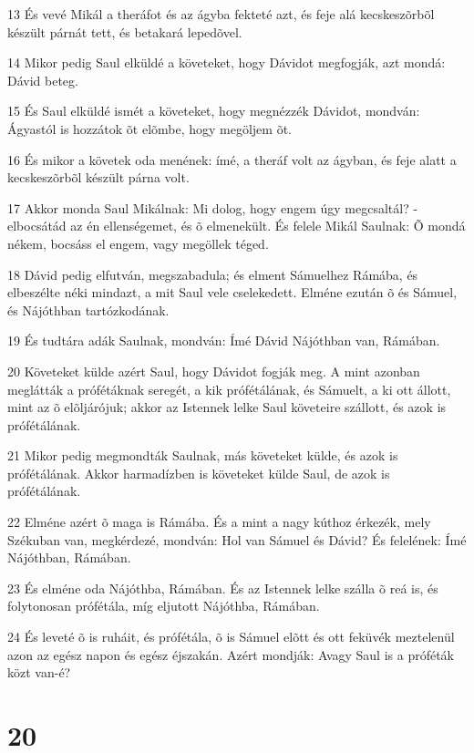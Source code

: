 \par 13 És vevé Mikál a theráfot és az ágyba fekteté azt, és feje alá kecskeszõrbõl készült párnát tett, és betakará lepedõvel.
\par 14 Mikor pedig Saul elküldé a követeket, hogy Dávidot megfogják, azt mondá: Dávid beteg.
\par 15 És Saul elküldé ismét a követeket, hogy megnézzék Dávidot, mondván: Ágyastól is hozzátok õt elõmbe, hogy megöljem õt.
\par 16 És mikor a követek oda menének: ímé, a theráf volt az ágyban, és feje alatt a kecskeszõrbõl készült párna volt.
\par 17 Akkor monda Saul Mikálnak: Mi dolog, hogy engem úgy megcsaltál? - elbocsátád az én ellenségemet, és õ elmenekült. És felele Mikál Saulnak: Õ mondá nékem, bocsáss el engem, vagy megöllek téged.
\par 18 Dávid pedig elfutván, megszabadula; és elment Sámuelhez Rámába, és elbeszélte néki mindazt, a mit Saul vele cselekedett. Elméne ezután õ és Sámuel, és Nájóthban tartózkodának.
\par 19 És tudtára adák Saulnak, mondván: Ímé Dávid Nájóthban van, Rámában.
\par 20 Követeket külde azért Saul, hogy Dávidot fogják meg. A mint azonban meglátták a prófétáknak seregét, a kik prófétálának, és Sámuelt, a ki ott állott, mint az õ elõljárójuk; akkor az Istennek lelke Saul követeire szállott, és azok is prófétálának.
\par 21 Mikor pedig megmondták Saulnak, más követeket külde, és azok is prófétálának. Akkor harmadízben is követeket külde Saul, de azok is prófétálának.
\par 22 Elméne azért õ maga is Rámába. És a mint a nagy kúthoz érkezék, mely Székuban van, megkérdezé, mondván: Hol van Sámuel és Dávid? És felelének: Ímé Nájóthban, Rámában.
\par 23 És elméne oda Nájóthba, Rámában. És az Istennek lelke szálla õ reá is, és folytonosan prófétála, míg eljutott Nájóthba, Rámában.
\par 24 És leveté õ is ruháit, és prófétála, õ is Sámuel elõtt és ott feküvék meztelenül azon az egész napon és egész éjszakán. Azért mondják: Avagy Saul is a próféták közt van-é?

\chapter{20}


